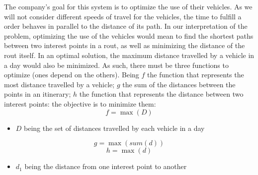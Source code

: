The company's goal for this system is to optimize the use of their vehicles. As we will not consider different speeds of travel for the vehicles, the time to fulfill a order behaves in parallel to the distance of its path. In our interpretation of the problem, optimizing the use of the vehicles would mean to find the shortest paths between two interest points in a rout, as well as minimizing the distance of the rout itself. In an optimal solution, the maximum distance travelled by a vehicle in a day would also be minimized. As such, there must be three functions to optimize (ones depend on the others). Being $ f $ the function that represents the most distance travelled by a vehicle; $ g $ the sum of the distances between the points in an itinerary; $ h $ the function that represents the distance between two interest points: the objective is to minimize them:
\[ f = \max(D) \]
\begin{itemize}
    \item $ D $ being the set of distances travelled by each vehicle in a day
\end{itemize}
\[ g = \max(sum(d)) \]
\[ h = \max(d) \]
\begin{itemize}
    \item $ d_1 $ being the distance from one interest point to another
\end{itemize}
